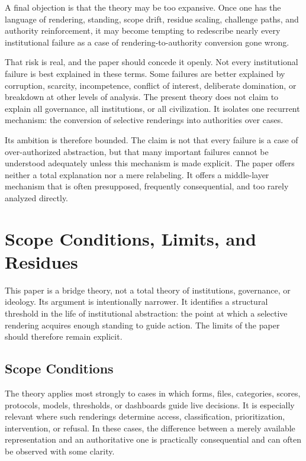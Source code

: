 \documentclass[11pt]{article}
\begin{document}
A final objection is that the theory may be too expansive. Once one has the language of rendering, standing, scope drift, residue scaling, challenge paths, and authority reinforcement, it may become tempting to redescribe nearly every institutional failure as a case of rendering-to-authority conversion gone wrong.

That risk is real, and the paper should concede it openly. Not every institutional failure is best explained in these terms. Some failures are better explained by corruption, scarcity, incompetence, conflict of interest, deliberate domination, or breakdown at other levels of analysis. The present theory does not claim to explain all governance, all institutions, or all civilization. It isolates one recurrent mechanism: the conversion of selective renderings into authorities over cases.

Its ambition is therefore bounded. The claim is not that every failure is a case of over-authorized abstraction, but that many important failures cannot be understood adequately unless this mechanism is made explicit. The paper offers neither a total explanation nor a mere relabeling. It offers a middle-layer mechanism that is often presupposed, frequently consequential, and too rarely analyzed directly.
\section{Scope Conditions, Limits, and Residues}

This paper is a bridge theory, not a total theory of institutions, governance, or ideology. Its argument is intentionally narrower. It identifies a structural threshold in the life of institutional abstraction: the point at which a selective rendering acquires enough standing to guide action. The limits of the paper should therefore remain explicit.

\subsection{Scope Conditions}

The theory applies most strongly to cases in which forms, files, categories, scores, protocols, models, thresholds, or dashboards guide live decisions. It is especially relevant where such renderings determine access, classification, prioritization, intervention, or refusal. In these cases, the difference between a merely available representation and an authoritative one is practically consequential and can often be observed with some clarity.
\end{document}
